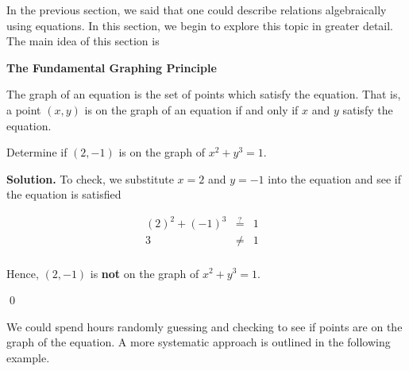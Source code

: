 

\setcounter{footnote}{0}

\label{GraphsofEquations}

In the previous section, we said that one could describe relations algebraically using equations.  In this section, we begin to explore this topic in greater detail.  The main idea of this section is

\medskip

\colorbox{ResultColor}{\bbm

\smallskip

\centerline{\textbf{The Fundamental Graphing Principle}}

\label{fgp}    

The graph of an equation is the set of points which satisfy the equation.  That is, a point $(x,y)$ is on the graph of an equation if and only if $x$ and $y$ satisfy the equation.

\smallskip

\ebm}

\medskip

\begin{ex} Determine if $(2,-1)$ is on the graph of $x^2 + y^3 = 1$.

\medskip

{\bf Solution.}  To check, we substitute $x=2$ and $y=-1$ into the equation and see if the equation is satisfied

\setlength{\extrarowheight}{2pt}

\[ \begin{array}{rclr}   
 (2)^2+(-1)^3 & \stackrel{?}{=} & 1 & \\ 
            3 & \neq & 1 & \\ 
            \end{array} \]

Hence, $(2,-1)$ is \textbf{not} on the graph of $x^2 + y^3 = 1$.

\qed

\end{ex}

We could spend hours randomly guessing and checking to see if points are on the graph of the equation.  A more systematic approach is outlined in the following example.

